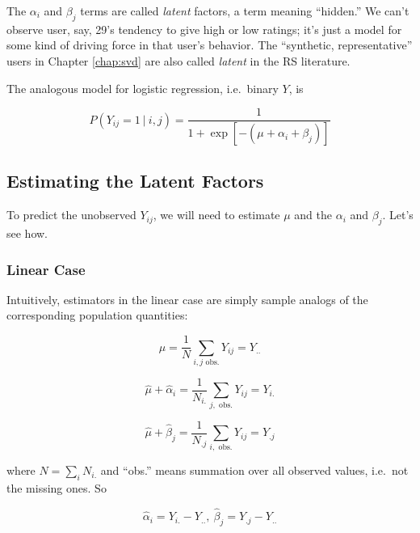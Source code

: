 The $\alpha_i$ and $\beta_j$ terms are called \textit{latent} factors, a
term meaning ``hidden.''  We can't observe user, say, 29's tendency to give
high or low ratings; it's just a model for some kind of driving force in
that user's behavior.  The ``synthetic, representative'' users in
Chapter \ref{chap:svd} are also called \textit{latent} in the RS
literature.

The analogous model for logistic regression, i.e.\ binary $Y$, is

\begin{equation}
P(Y_{ij} = 1 ~|~ i,j) = 
\frac{1}{1 + \exp[-(\mu + \alpha_i + \beta_j)]}
\end{equation}

\subsection{Estimating the Latent Factors}

To predict the unobserved $Y_{ij}$, we will need to estimate $\mu$ and
the $\alpha_i$ and $\beta_j$.  Let's see how.

\subsubsection{Linear Case}

Intuitively, estimators in the linear case are simply sample analogs of
the corresponding population quantities:

\begin{equation}
\widehat{\mu} = \frac{1}{N} \sum_{i,j \textrm{ obs.}} Y_{ij} = Y_{..}
\end{equation}

\begin{equation}
\label{yi.}
\widehat{\mu} + \widehat{\alpha}_i = \frac{1}{N_{i.}}
\sum_{j, \textrm{ obs.}} Y_{ij} = Y_{i.}
\end{equation}

\begin{equation}
\label{y.j}
\widehat{\mu} + \widehat{\beta}_j = \frac{1}{N_{.j}}
\sum_{i, \textrm{ obs.}} Y_{ij} = Y_{.j}
\end{equation}

where $N = \sum_{i} N_{i.}$ and ``obs.'' means summation over all
observed values, i.e.\ not the missing ones.  So 

\begin{equation}
\widehat{\alpha}_i = Y_{i.}-Y_{..},~ 
\widehat{\beta}_j = Y_{.j}-Y_{..} 
\end{equation}

